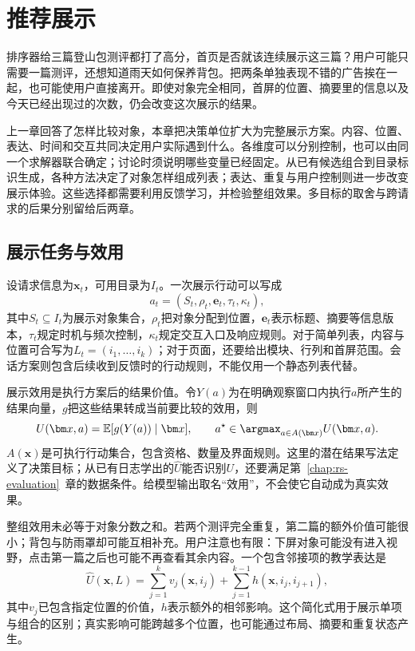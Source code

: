 \chapter{推荐展示}
\label{chap:rs-presentation}

排序器给三篇登山包测评都打了高分，首页是否就该连续展示这三篇？用户可能只需要一篇测评，还想知道雨天如何保养背包。把两条单独表现不错的广告挨在一起，也可能使用户直接离开。即使对象完全相同，首屏的位置、摘要里的信息以及今天已经出现过的次数，仍会改变这次展示的结果。

上一章回答了怎样比较对象，本章把决策单位扩大为完整展示方案。内容、位置、表达、时间和交互共同决定用户实际遇到什么。各维度可以分别控制，也可以由同一个求解器联合确定；讨论时须说明哪些变量已经固定。从已有候选组合到目录标识生成，各种方法决定了对象怎样组成列表；表达、重复与用户控制则进一步改变展示体验。这些选择都需要利用反馈学习，并检验整组效果。多目标的取舍与跨请求的后果分别留给后两章。

\section{展示任务与效用}
\label{sec:rs-presentation-task}

设请求信息为$\bm{x}_t$，可用目录为$I_t$。一次展示行动可以写成
\begin{equation}
 a_t=(S_t,\rho_t,\bm e_t,\tau_t,\kappa_t),
 \label{eq:rs-presentation-action}
\end{equation}
其中$S_t\subseteq I_t$为展示对象集合，$\rho_t$把对象分配到位置，$\bm e_t$表示标题、摘要等信息版本，$\tau_t$规定时机与频次控制，$\kappa_t$规定交互入口及响应规则。对于简单列表，内容与位置可合写为$L_t=(i_1,\ldots,i_k)$；对于页面，还要给出模块、行列和首屏范围。会话方案则包含后续收到反馈时的行动规则，不能仅用一个静态列表代替。

展示效用是执行方案后的结果价值。令$Y(a)$为在明确观察窗口内执行$a$所产生的结果向量，$g$把这些结果转成当前要比较的效用，则
\begin{equation}
 U(\bm x,a)=\mathbb E[g(Y(a))\mid\bm x],\qquad
 a^\star\in\argmax_{a\in A(\bm x)}U(\bm x,a).
 \label{eq:rs-presentation-utility}
\end{equation}
$A(\bm x)$是可执行行动集合，包含资格、数量及界面规则。这里的潜在结果写法定义了决策目标；从已有日志学出的$\widehat U$能否识别$U$，还要满足第~\ref{chap:rs-evaluation}~章的数据条件。给模型输出取名“效用”，不会使它自动成为真实效果。

整组效用未必等于对象分数之和。若两个测评完全重复，第二篇的额外价值可能很小；背包与防雨罩却可能互相补充。用户注意也有限：下屏对象可能没有进入视野，点击第一篇之后也可能不再查看其余内容。一个包含邻接项的教学表达是
\[
 \widehat U(\bm x,L)
 =\sum_{j=1}^{k}v_j(\bm x,i_j)
  +\sum_{j=1}^{k-1}h(\bm x,i_j,i_{j+1}),
\]
其中$v_j$已包含指定位置的价值，$h$表示额外的相邻影响。这个简化式用于展示单项与组合的区别；真实影响可能跨越多个位置，也可能通过布局、摘要和重复状态产生。

